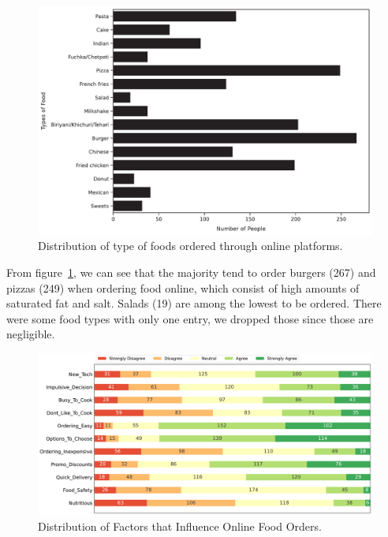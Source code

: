 \documentclass[a4paper,fleqn]{cas-sc}
\begin{document}
\begin{figure}[htb]
  \centering
  \includegraphics[width = \textwidth]{figs/food_distribution.pdf}
  \caption{Distribution of type of foods ordered through online platforms.}
  \label{fig:food_distribution}
\end{figure}

From figure~\ref{fig:food_distribution}, we can see that the majority tend to order burgers (267) and pizzas (249) when ordering food online, which consist of high amounts of saturated fat and salt. Salads (19) are among the lowest to be ordered. There were some food types with only one entry, we dropped those since those are negligible.

\begin{figure}[htb]
  \centering
  \includegraphics[width = \textwidth]{figs/likert.pdf}
  \caption{Distribution of Factors that Influence Online Food Orders.}
  \label{fig:factors}
\end{figure}
\end{document}
